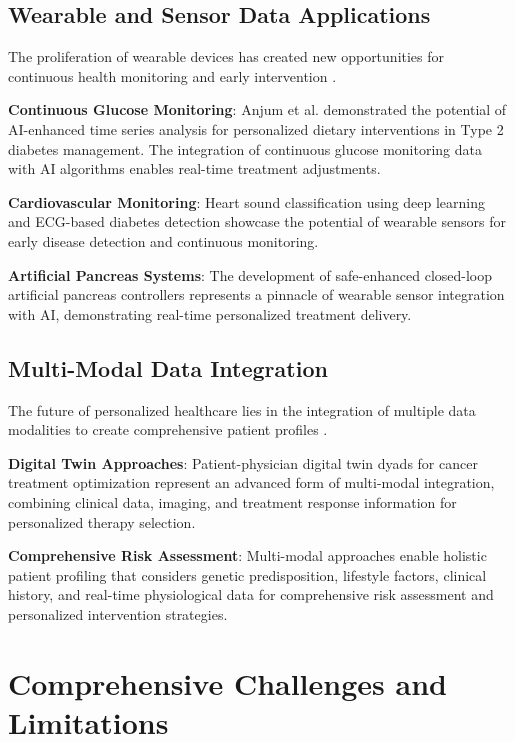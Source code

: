 \documentclass[runningheads]{llncs}
\begin{document}
\subsection{Wearable and Sensor Data Applications}
The proliferation of wearable devices has created new opportunities for continuous health monitoring and early intervention \cite{article_9}.

\textbf{Continuous Glucose Monitoring}: Anjum et al. \cite{article_9} demonstrated the potential of AI-enhanced time series analysis for personalized dietary interventions in Type 2 diabetes management. The integration of continuous glucose monitoring data with AI algorithms enables real-time treatment adjustments.

\textbf{Cardiovascular Monitoring}: Heart sound classification using deep learning \cite{article_6} and ECG-based diabetes detection \cite{article_4} showcase the potential of wearable sensors for early disease detection and continuous monitoring.

\textbf{Artificial Pancreas Systems}: The development of safe-enhanced closed-loop artificial pancreas controllers \cite{article_22} represents a pinnacle of wearable sensor integration with AI, demonstrating real-time personalized treatment delivery.

\subsection{Multi-Modal Data Integration}
The future of personalized healthcare lies in the integration of multiple data modalities to create comprehensive patient profiles \cite{generative_ai_2024}.

\textbf{Digital Twin Approaches}: Patient-physician digital twin dyads for cancer treatment optimization \cite{article_17} represent an advanced form of multi-modal integration, combining clinical data, imaging, and treatment response information for personalized therapy selection.

\textbf{Comprehensive Risk Assessment}: Multi-modal approaches enable holistic patient profiling that considers genetic predisposition, lifestyle factors, clinical history, and real-time physiological data for comprehensive risk assessment and personalized intervention strategies.

\section{Comprehensive Challenges and Limitations}
\end{document}
